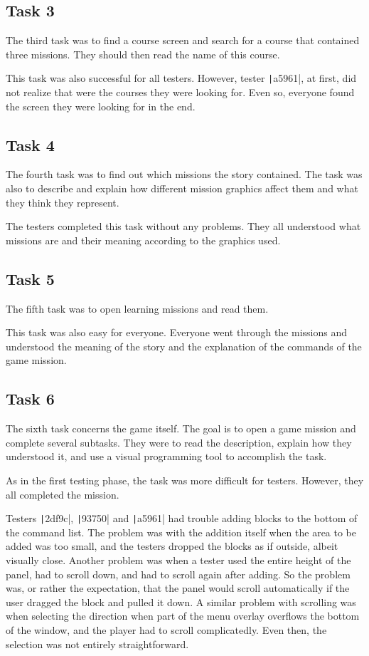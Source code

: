 \subsection*{Task 3}

The third task was to find a course screen and search for a course that contained three missions.
They should then read the name of this course.

This task was also successful for all testers.
However, tester \texttt|a5961|, at first, did not realize that  were the courses they were looking for.
Even so, everyone found the screen they were looking for in the end.

\subsection*{Task 4}

The fourth task was to find out which missions the story contained.
The task was also to describe and explain how different mission graphics affect them and what they think they represent.

The testers completed this task without any problems.
They all understood what missions are and their meaning according to the graphics used.

\subsection*{Task 5}

The fifth task was to open learning missions and read them.

This task was also easy for everyone.
Everyone went through the missions and understood the meaning of the story and the explanation of the commands of the game mission.

\subsection*{Task 6}

The sixth task concerns the game itself.
The goal is to open a game mission and complete several subtasks.
They were to read the description, explain how they understood it, and use a visual programming tool to accomplish the task.

As in the first testing phase, the task was more difficult for testers.
However, they all completed the mission.

Testers \texttt|2df9c|, \texttt|93750| and \texttt|a5961| had trouble adding blocks to the bottom of the command list.
The problem was with the addition itself when the area to be added was too small, and the testers dropped the blocks as if outside, albeit visually close.
Another problem was when a tester used the entire height of the panel, had to scroll down, and had to scroll again after adding.
So the problem was, or rather the expectation, that the panel would scroll automatically if the user dragged the block and pulled it down.
A similar problem with scrolling was when selecting the direction when part of the menu overlay overflows the bottom of the window, and the player had to scroll complicatedly. Even then, the selection was not entirely straightforward.


